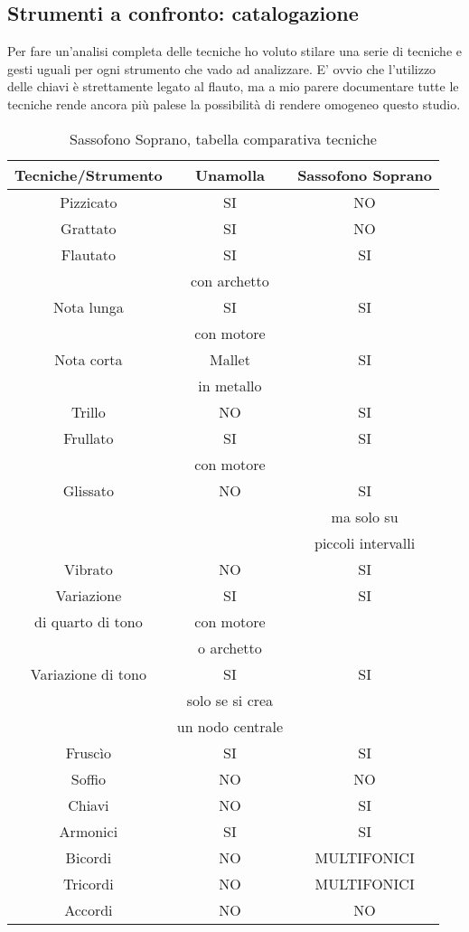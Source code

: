 \subsection{Strumenti a confronto: catalogazione}

Per fare un’analisi completa delle tecniche ho voluto stilare una serie di tecniche e gesti uguali per ogni strumento che vado ad analizzare. E’ ovvio che l’utilizzo delle chiavi è strettamente legato al flauto, ma a mio parere documentare tutte le tecniche rende ancora più palese la possibilità di rendere omogeneo questo studio.

\begin{table}[htp]
\caption{Sassofono Soprano, tabella comparativa tecniche}
\begin{center}
\begin{tabular}{|c|c|c|}
\hline
\textbf{Tecniche/Strumento} & \textbf{Unamolla} & \textbf{Sassofono Soprano} \\
\hline
Pizzicato & SI & NO \\
\hline
Grattato & SI & NO \\
\hline
Flautato & SI & SI \\
		&con archetto & \\
\hline
Nota lunga & SI & SI \\
		&con motore & \\
\hline
Nota corta & Mallet & SI \\
		&in metallo & \\
\hline
Trillo & NO & SI \\
\hline
Frullato & SI & SI \\
		&con motore & \\
\hline
Glissato & NO & SI \\
		& & ma solo su \\
				& & piccoli intervalli \\

\hline

Vibrato & NO & SI \\

\hline

Variazione & SI & SI \\
di quarto di tono & con motore & \\
& o archetto & \\

\hline
Variazione di tono & SI & SI \\
& solo se si crea & \\
& un nodo centrale & \\
\hline
Fruscìo & SI & SI \\
\hline
Soffio & NO & NO \\
\hline
Chiavi & NO & SI \\
\hline
Armonici & SI & SI \\
\hline
Bicordi & NO & MULTIFONICI \\
\hline
Tricordi & NO & MULTIFONICI \\
\hline
Accordi & NO &NO \\
\hline
\end{tabular}
\end{center}
\label{default}
\end{table}%

